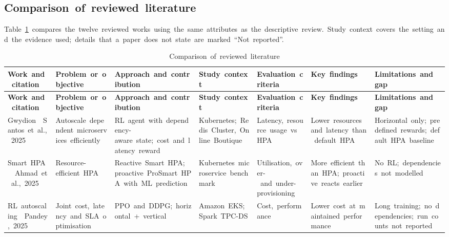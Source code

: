 \documentclass[12pt,a4paper,oneside]{report}
\begin{document}
\clearpage\begin{landscape}

\section{Comparison~of~reviewed~literature}

Table~\ref{tab:literature}~compares~the~twelve~reviewed~works~using~the~same~attributes~as~the~descriptive~review.~Study~context~covers~the~setting~and~the~evidence~used;~details~that~a~paper~does~not~state~are~marked~``Not~reported''.


\begingroup\small\setlength{\tabcolsep}{4pt}\renewcommand{\arraystretch}{1.25}
\begin{longtable}{|>{\raggedright\arraybackslash}p{2.85cm}|>{\raggedright\arraybackslash}p{2.85cm}|>{\raggedright\arraybackslash}p{3.73cm}|>{\raggedright\arraybackslash}p{3.07cm}|>{\raggedright\arraybackslash}p{2.85cm}|>{\raggedright\arraybackslash}p{3.29cm}|>{\raggedright\arraybackslash}p{3.29cm}|}
\caption{Comparison~of~reviewed~literature}\label{tab:literature}\\\hline
\textbf{Work~and~citation} & \textbf{Problem~or~objective} & \textbf{Approach~and~contribution} & \textbf{Study~context} & \textbf{Evaluation~criteria} & \textbf{Key~findings} & \textbf{Limitations~and~gap}\\\hline\endfirsthead
\hline \textbf{Work~and~citation} & \textbf{Problem~or~objective} & \textbf{Approach~and~contribution} & \textbf{Study~context} & \textbf{Evaluation~criteria} & \textbf{Key~findings} & \textbf{Limitations~and~gap}\\\hline\endhead
Gwydion~\cite{gwydion}~Santos~et~al.,~2025 & Autoscale~dependent~microservices~efficiently & RL~agent~with~dependency-aware~state;~cost~and~latency~reward & Kubernetes;~Redis~Cluster,~Online~Boutique & Latency,~resource~usage~vs~HPA & Lower~resources~and~latency~than~default~HPA & Horizontal~only;~predefined~rewards;~default~HPA~baseline\\\hline
Smart~HPA~\cite{smarthpa}~Ahmad~et~al.,~2025 & Resource-efficient~HPA & Reactive~Smart~HPA;~proactive~ProSmart~HPA~with~ML~prediction & Kubernetes~microservice~benchmark & Utilisation,~over-~and~under-provisioning & More~efficient~than~HPA;~proactive~reacts~earlier & No~RL;~dependencies~not~modelled\\\hline
RL~autoscaling~\cite{pandey}~Pandey,~2025 & Joint~cost,~latency~and~SLA~optimisation & PPO~and~DDPG;~horizontal~+~vertical & Amazon~EKS;~Spark~TPC-DS & Cost,~performance & Lower~cost~at~maintained~performance & Long~training;~no~dependencies;~run~counts~not~reported\\\hline

\end{longtable}
\end{landscape}
\end{document}
